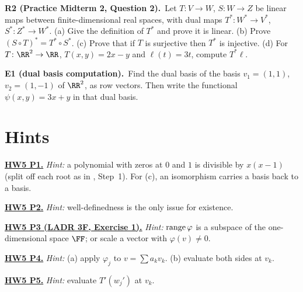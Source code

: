 \documentclass[10pt]{scrartcl}
\begin{document}
\begin{prob}\textbf{R2 (Practice Midterm 2, Question 2).}\ Let $T\colon V\to W$, $S\colon W\to Z$ be linear maps between finite-dimensional real spaces, with dual maps $T^*\colon W^*\to V^*$, $S^*\colon Z^*\to W^*$. (a) Give the definition of $T^*$ and prove it is linear. (b) Prove $(S\circ T)^*=T^*\circ S^*$. (c) Prove that if $T$ is surjective then $T^*$ is injective. (d) For $T\colon\RR^2\to\RR$, $T(x,y)=2x-y$ and $\ell(t)=3t$, compute $T^*\ell$.
\end{prob}
\begin{prob}\textbf{E1 (dual basis computation).}\ Find the dual basis of the basis $v_1=(1,1)$, $v_2=(1,-1)$ of $\RR^2$, as row vectors. Then write the functional $\psi(x,y)=3x+y$ in that dual basis.
\end{prob}

\section*{Hints}

\par\medskip\noindent\textbf{\hyperlink{prob-HW5-P1}{HW5 P1.}} \emph{Hint:} a polynomial with zeros at $0$ and $1$ is divisible by $x(x-1)$ (split off each root as in , Step~1). For (c), an isomorphism carries a basis back to a basis.

\par\medskip\noindent\textbf{\hyperlink{prob-HW5-P2}{HW5 P2.}} \emph{Hint:} well-definedness is the only issue for existence.

\par\medskip\noindent\textbf{\hyperlink{prob-HW5-P3}{HW5 P3 (LADR 3F, Exercise 1).}} \emph{Hint:} $\operatorname{range}\varphi$ is a subspace of the one-dimensional space $\FF$; or scale a vector with $\varphi(v)\ne0$.

\par\medskip\noindent\textbf{\hyperlink{prob-HW5-P4}{HW5 P4.}} \emph{Hint:} (a) apply $\varphi_j$ to $v=\sum a_kv_k$. (b) evaluate both sides at $v_k$.

\par\medskip\noindent\textbf{\hyperlink{prob-HW5-P5}{HW5 P5.}} \emph{Hint:} evaluate $T'(w_j')$ at $v_k$.
\end{document}
